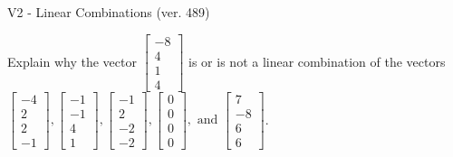 \begin{exercise}
  \begin{exerciseTitle}V2 - Linear Combinations (ver. 489)\end{exerciseTitle}
  \begin{exerciseStatement}
    Explain why the vector \(\left[\begin{array}{c}
-8 \\
4 \\
1 \\
4
\end{array}\right]\)  is or is not a linear 
	combination of the vectors \(\left[\begin{array}{c}
-4 \\
2 \\
2 \\
-1
\end{array}\right] , \left[\begin{array}{c}
-1 \\
-1 \\
4 \\
1
\end{array}\right] , \left[\begin{array}{c}
-1 \\
2 \\
-2 \\
-2
\end{array}\right] , \left[\begin{array}{c}
0 \\
0 \\
0 \\
0
\end{array}\right] , \text{ and } \left[\begin{array}{c}
7 \\
-8 \\
6 \\
6
\end{array}\right]\).
	



\end{exerciseStatement}
\end{exercise}
